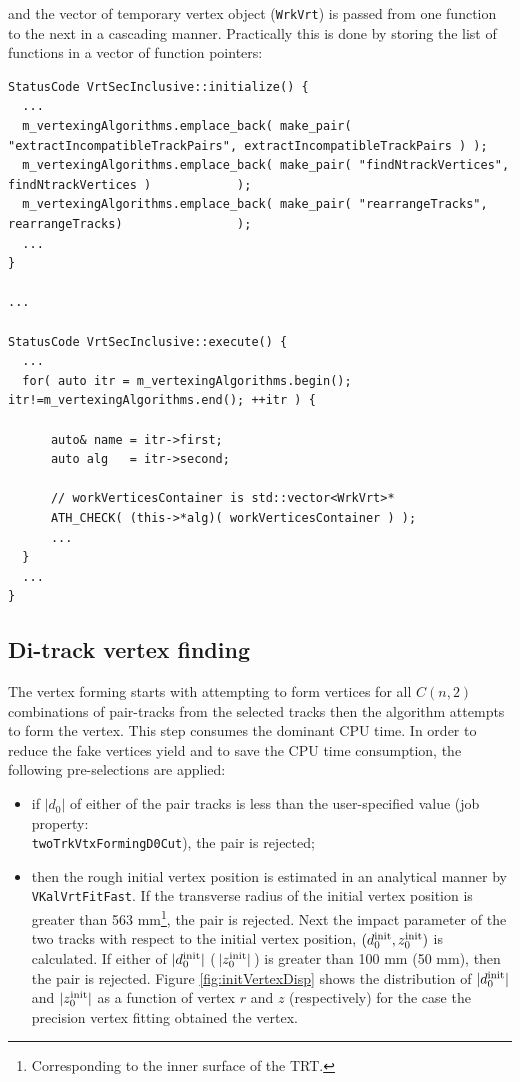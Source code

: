 \documentclass[NOTE, atlasdraft=true, texlive=2018, UKenglish]{\ATLASLATEXPATH atlasdoc}
\begin{document}
and the vector of temporary vertex object ({\tt WrkVrt}) is passed from one function to the next in a cascading manner. Practically this is done by storing the list of functions in a vector of function pointers:

\begin{scriptsize}
\begin{verbatim}
StatusCode VrtSecInclusive::initialize() {
  ...
  m_vertexingAlgorithms.emplace_back( make_pair( "extractIncompatibleTrackPairs", extractIncompatibleTrackPairs ) );
  m_vertexingAlgorithms.emplace_back( make_pair( "findNtrackVertices",            findNtrackVertices )            );
  m_vertexingAlgorithms.emplace_back( make_pair( "rearrangeTracks",               rearrangeTracks)                );
  ...
}

...

StatusCode VrtSecInclusive::execute() {
  ...
  for( auto itr = m_vertexingAlgorithms.begin(); itr!=m_vertexingAlgorithms.end(); ++itr ) {
      
      auto& name = itr->first;
      auto alg   = itr->second;
      
      // workVerticesContainer is std::vector<WrkVrt>*
      ATH_CHECK( (this->*alg)( workVerticesContainer ) );
      ...
  }
  ...
}
\end{verbatim}
\end{scriptsize}


\subsection{Di-track vertex finding}\label{sec:ditrack}

The vertex forming starts with attempting to form vertices for all $C(n,2)$ combinations of pair-tracks from the selected tracks then the algorithm attempts to form the vertex. This step consumes the dominant CPU time. In order to reduce the fake vertices yield and to save the CPU time consumption, the following pre-selections are applied:

\begin{itemize}
\item if $|d_{0}|$ of either of the pair tracks is less than the user-specified value (job property:\\ {\tt twoTrkVtxFormingD0Cut}), the pair is rejected;
\item then the rough initial vertex position is estimated in an analytical manner by {\tt VKalVrtFitFast}. If the transverse radius of the initial vertex position is greater than 563 mm\footnote{Corresponding to the inner surface of the TRT.}, the pair is rejected. Next the impact parameter of the two tracks with respect to the initial vertex position, $(d_{0}^{\rm init}, z_{0}^{\rm init})$ is calculated. If either of $|d_{0}^{\rm init}|$ (\,$|z_{0}^{\rm init}|$\,) is greater than 100 mm (50 mm), then the pair is rejected. Figure \ref{fig:initVertexDisp} shows the distribution of $|d_{0}^{\rm init}|$ and $|z_{0}^{\rm init}|$ as a function of vertex $r$ and $z$ (respectively) for the case the precision vertex fitting obtained the vertex.
\end{itemize}
\end{document}
